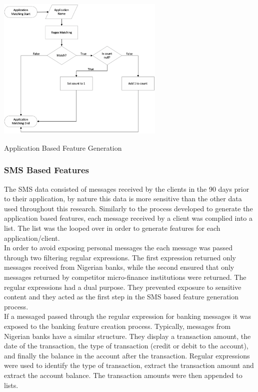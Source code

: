 \vspace{15pt}

\begin{Figure}[!htb]
\centering
\includegraphics[width=0.6\textwidth]{images/app_feats.png}
\caption{Application Based Feature Generation}
\label{fig:app_features}
\end{Figure}

\vspace{15pt}


\subsubsection{SMS Based Features}

The SMS data consisted of messages received by the clients in the 90 days prior to their application, by nature this data is more sensitive than the other data used throughout this research. Similarly to the process developed to generate the application based features, each message received by a client was complied into a list. The list was the looped over in order to generate features for each application/client. \\ 

In order to avoid exposing personal messages the each message was passed through two filtering regular expressions. The first expression returned only messages received from Nigerian banks, while the second ensured that only messages returned by competitor micro-finance institutions were returned. The regular expressions had a dual purpose. They prevented exposure to sensitive content and they acted as the first step in the SMS based feature generation process. \\

If a messaged passed through the regular expression for banking messages it was exposed to the banking feature creation process. Typically, messages from Nigerian banks have a similar structure. They display a transaction amount, the date of the transaction, the type of transaction (credit or debit to the account), and finally the balance in the account after the transaction. Regular expressions were used to identify the type of transaction, extract the transaction amount and extract the account balance. The transaction amounts were then appended to lists.  \\

